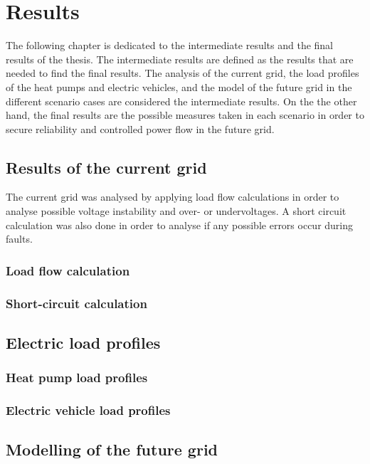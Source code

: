 \chapter{Results}

The following chapter is dedicated to the intermediate results and the final results of the thesis. The intermediate results are defined as the results that are needed to find the final results. The analysis of the current grid, the load profiles of the heat pumps and electric vehicles, and the model of the future grid in the different scenario cases are considered the intermediate results. On the the other hand, the final results are the possible measures taken in each scenario in order to secure reliability and controlled power flow in the future grid. 

\section{Results of the current grid}

The current grid was analysed by applying load flow calculations in order to analyse possible voltage instability and over- or undervoltages. A short circuit calculation was also done in order to analyse if any possible errors occur during faults.  

\subsection{Load flow calculation}

\subsection{Short-circuit calculation}

\section{Electric load profiles}

\subsection{Heat pump load profiles}

\subsection{Electric vehicle load profiles}

\section{Modelling of the future grid}
